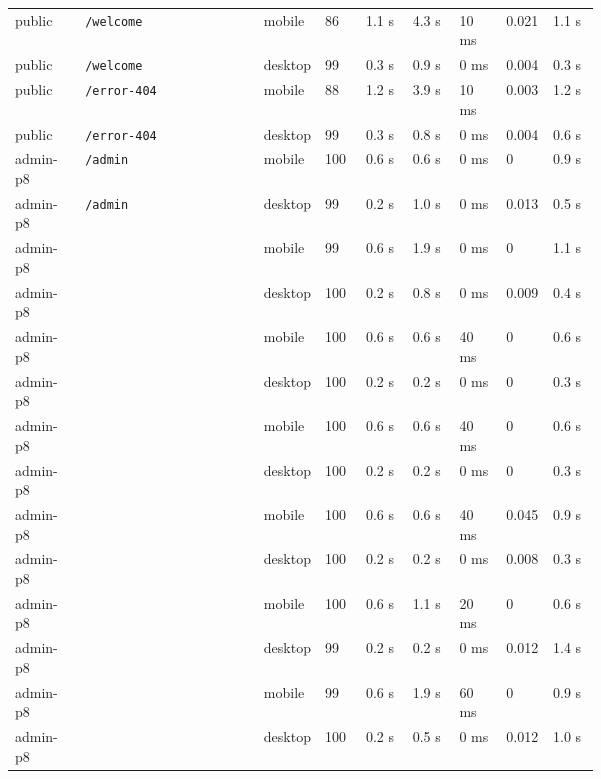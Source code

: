 \begin{landscape}
\begin{xltabular}{\linewidth}{p{0.12\linewidth} X p{0.09\linewidth} p{0.07\linewidth} p{0.08\linewidth} p{0.08\linewidth} p{0.08\linewidth} p{0.08\linewidth} p{0.08\linewidth}}
public & \texttt{/welcome} & mobile & 86 & 1.1 s & 4.3 s & 10 ms & 0.021 & 1.1 s \\
public & \texttt{/welcome} & desktop & 99 & 0.3 s & 0.9 s & 0 ms & 0.004 & 0.3 s \\

public & \texttt{/error-404} & mobile & 88 & 1.2 s & 3.9 s & 10 ms & 0.003 & 1.2 s \\
public & \texttt{/error-404} & desktop & 99 & 0.3 s & 0.8 s & 0 ms & 0.004 & 0.6 s \\

admin-p8 & \texttt{/admin} & mobile & 100 & 0.6 s & 0.6 s & 0 ms & 0 & 0.9 s \\
admin-p8 & \texttt{/admin} & desktop & 99 & 0.2 s & 1.0 s & 0 ms & 0.013 & 0.5 s \\

admin-p8 &  & mobile & 99 & 0.6 s & 1.9 s & 0 ms & 0 & 1.1 s \\
admin-p8 &  & desktop & 100 & 0.2 s & 0.8 s & 0 ms & 0.009 & 0.4 s \\

admin-p8 &  & mobile & 100 & 0.6 s & 0.6 s & 40 ms & 0 & 0.6 s \\
admin-p8 &  & desktop & 100 & 0.2 s & 0.2 s & 0 ms & 0 & 0.3 s \\

admin-p8 &  & mobile & 100 & 0.6 s & 0.6 s & 40 ms & 0 & 0.6 s \\
admin-p8 &  & desktop & 100 & 0.2 s & 0.2 s & 0 ms & 0 & 0.3 s \\

admin-p8 &  & mobile & 100 & 0.6 s & 0.6 s & 40 ms & 0.045 & 0.9 s \\
admin-p8 &  & desktop & 100 & 0.2 s & 0.2 s & 0 ms & 0.008 & 0.3 s \\

admin-p8 &  & mobile & 100 & 0.6 s & 1.1 s & 20 ms & 0 & 0.6 s \\
admin-p8 &  & desktop & 99 & 0.2 s & 0.2 s & 0 ms & 0.012 & 1.4 s \\

admin-p8 &  & mobile & 99 & 0.6 s & 1.9 s & 60 ms & 0 & 0.9 s \\
admin-p8 &  & desktop & 100 & 0.2 s & 0.5 s & 0 ms & 0.012 & 1.0 s \\


\end{xltabular}
\end{landscape}
